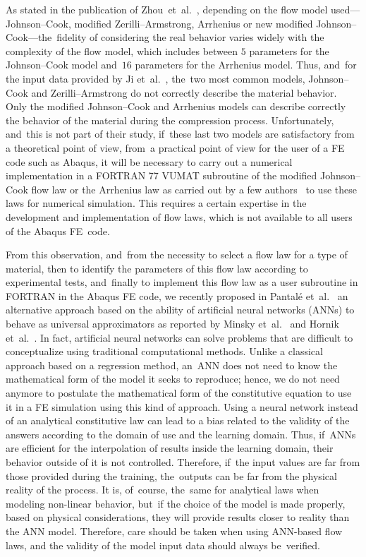 \documentclass[algorithms,article,accept,pdftex,oneauthors]{Definitions/mdpi}
\begin{document}
As stated in the publication of \mbox{Zhou et~al.~\cite{Zhou-2020}}, depending on the flow model used---Johnson--Cook, modified Zerilli--Armstrong, Arrhenius or new modified Johnson--Cook---the~fidelity of considering the real behavior varies widely with the complexity of the flow model, which includes between $5$ parameters for the Johnson--Cook model and~$16$ parameters for the Arrhenius model.
Thus, and~for the input data provided by Ji et~al.~\cite{Ji-2018}, the~two most common models, Johnson--Cook and Zerilli--Armstrong do not correctly describe the material behavior.
Only the modified Johnson--Cook and Arrhenius models can describe correctly the behavior of the material during the compression process.
Unfortunately, and~this is not part of their study, if~these last two models are satisfactory from a theoretical point of view, from~a practical point of view for the user of a FE code such as Abaqus, it will be necessary to carry out a numerical implementation in a FORTRAN 77 VUMAT subroutine of the modified Johnson--Cook flow law or the Arrhenius law as carried out by a few authors~\cite{Liang-2022, Gao-2007-FRT, Ming-2018} to use these laws for numerical simulation.
This requires a certain expertise in the development and implementation of flow laws, which is not available to all users of the Abaqus FE~code.

From this observation, and~from the necessity to select a flow law for a type of material, then to identify the parameters of this flow law according to experimental tests, and~finally to implement this flow law as a user subroutine in FORTRAN in the Abaqus FE code, we recently proposed in Pantalé et~al.~\cite{Pantale-2021} an alternative approach based on the ability of artificial neural networks (ANNs) to behave as universal approximators as reported by Minsky et~al.~\cite{Minsky-1969} and Hornik et~al.~\cite{Hornik-1989}.
In fact, artificial neural networks can solve problems that are difficult to conceptualize using traditional computational methods.
Unlike a classical approach based on a regression method, an~ANN does not need to know the mathematical form of the model it seeks to reproduce; hence, we do not need anymore to postulate the mathematical form of the constitutive equation to use it in a FE simulation using this kind of approach.
Using a neural network instead of an analytical constitutive law can lead to a bias related to the validity of the answers according to the domain of use and the learning domain.
Thus, if~ANNs are efficient for the interpolation of results inside the learning domain, their behavior outside of it is not controlled.
Therefore, if~the input values are far from those provided during the training, the~outputs can be far from the physical reality of the process.
It is, of~course, the~same for analytical laws when modeling non-linear behavior, but~if the choice of the model is made properly, based on physical considerations, they will provide results closer to reality than the ANN model.
Therefore, care should be taken when using ANN-based flow laws, and the validity of the model input data should always be~verified.
\end{document}
